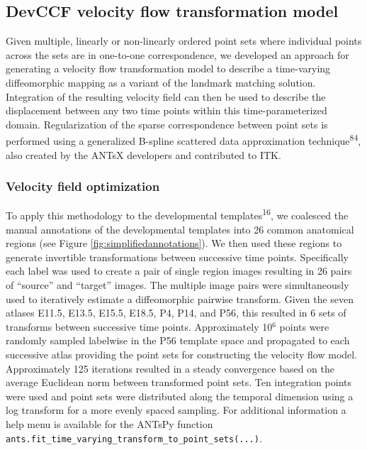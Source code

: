 \documentclass[
  12pt,
]{article}
\begin{document}
\subsection{DevCCF velocity flow transformation
model}\label{devccf-velocity-flow-transformation-model}

Given multiple, linearly or non-linearly ordered point sets where
individual points across the sets are in one-to-one correspondence, we
developed an approach for generating a velocity flow transformation
model to describe a time-varying diffeomorphic mapping as a variant of
the landmark matching solution. Integration of the resulting velocity
field can then be used to describe the displacement between any two time
points within this time-parameterized domain. Regularization of the
sparse correspondence between point sets is performed using a
generalized B-spline scattered data approximation
technique\textsuperscript{84}, also created by the ANTsX developers and
contributed to ITK.

\subsubsection{Velocity field
optimization}\label{velocity-field-optimization}

To apply this methodology to the developmental
templates\textsuperscript{16}, we coalesced the manual annotations of
the developmental templates into 26 common anatomical regions (see
Figure \ref{fig:simplifiedannotations}). We then used these regions to
generate invertible transformations between successive time points.
Specifically each label was used to create a pair of single region
images resulting in 26 pairs of ``source'' and ``target'' images. The
multiple image pairs were simultaneously used to iteratively estimate a
diffeomorphic pairwise transform. Given the seven atlases E11.5, E13.5,
E15.5, E18.5, P4, P14, and P56, this resulted in 6 sets of transforms
between successive time points. Approximately 10\(^6\) points were
randomly sampled labelwise in the P56 template space and propagated to
each successive atlas providing the point sets for constructing the
velocity flow model. Approximately 125 iterations resulted in a steady
convergence based on the average Euclidean norm between transformed
point sets. Ten integration points were used and point sets were
distributed along the temporal dimension using a log transform for a
more evenly spaced sampling. For additional information a help menu is
available for the ANTsPy function
\texttt{ants.fit\_time\_varying\_transform\_to\_point\_sets(...)}.
\end{document}
